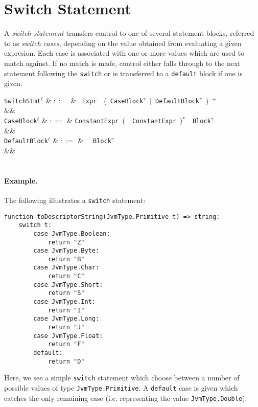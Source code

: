 
\section{Switch Statement}
\label{c_stmts_switch}
A {\em switch statement} transfers control to one of several statement blocks, referred to as {\em switch cases}, depending on the value obtained from evaluating a given expresion.  Each case is associated with one or more values which are used to match against.  If no match is made, control either falls through to the next statement following the \lstinline{switch} or is transferred to a \lstinline{default} block if one is given.

\begin{syntax}
  \verb+SwitchStmt+$^\ell$ & $::=$ & \ \verb+Expr+\ \token{:}\ \big(\ \verb+CaseBlock+$^\gamma$\ $|$\ \verb+DefaultBlock+$^\gamma$\ \big)\ $^+$\\
  &&\\
  \verb+CaseBlock+$^\ell$ & $::=$ &  \verb+ConstantExpr+\ \big(\ \token{,}\ \verb+ConstantExpr+\ \big)$^*$\ \token{:}\ \verb+Block+$^\gamma$\\
  &&\\
  \verb+DefaultBlock+$^\ell$ & $::=$ & \ \token{:}\ \verb+Block+$^\gamma$\\
&&\\
\\
\end{syntax}

\paragraph{Example.} The following illustrates a \lstinline{switch} statement:

\begin{lstlisting}
function toDescriptorString(JvmType.Primitive t) => string:
    switch t:
        case JvmType.Boolean:
            return "Z"
        case JvmType.Byte:
            return "B"
        case JvmType.Char:
            return "C"
        case JvmType.Short:
            return "S"
        case JvmType.Int:
            return "I"
        case JvmType.Long:
            return "J"
        case JvmType.Float:
            return "F"
        default:
            return "D"
\end{lstlisting}
Here, we see a simple \lstinline{switch} statement which choose between a number of possible values of type \lstinline{JvmType.Primitive}.  A \lstinline{default} case is given which catches the only remaining case (i.e. representing the value \lstinline{JvmType.Double}).

